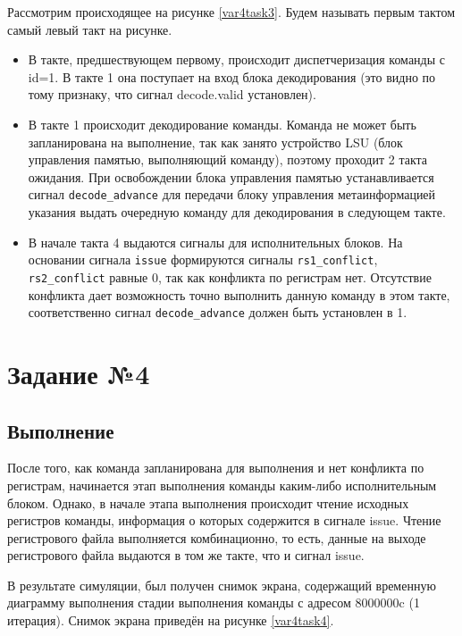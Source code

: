 Рассмотрим происходящее на рисунке \ref{var4task3}. Будем называть первым тактом самый левый такт на рисунке.
\begin{itemize}
	\item В такте, предшествующем первому, происходит диспетчеризация команды с id=1. В такте 1 она поступает на вход блока декодирования (это видно по тому признаку, что сигнал decode.valid установлен).
	\item В такте 1 происходит декодирование команды. Команда не может быть запланирована на выполнение, так как занято устройство LSU (блок управления памятью, выполняющий команду), поэтому проходит 2 такта ожидания. При освобождении блока управления памятью устанавливается сигнал \verb|decode_advance| для передачи блоку управления метаинформацией указания выдать очередную команду для декодирования в следующем такте.
	\item В начале такта 4 выдаются сигналы для исполнительных блоков. На основании сигнала \verb|issue| формируются сигналы \verb|rs1_conflict|, \verb|rs2_conflict| равные 0, так как конфликта по регистрам нет. Отсутствие конфликта дает возможность точно выполнить данную команду в этом такте, соответственно сигнал \verb|decode_advance| должен быть установлен в 1.
\end{itemize}

\chapter{Задание №4}
\section{Выполнение}
После того, как команда запланирована для выполнения и нет конфликта по регистрам, начинается этап выполнения команды каким-либо исполнительным блоком. Однако, в начале этапа выполнения происходит чтение исходных регистров команды, информация о которых содержится в сигнале issue. Чтение регистрового файла выполняется комбинационно, то есть, данные на выходе регистрового файла выдаются в том же такте, что и сигнал issue.

В результате симуляции, был получен снимок экрана, содержащий временную диаграмму выполнения стадии выполнения команды с адресом 8000000c (1 итерация). Снимок экрана приведён на рисунке \ref{var4task4}.

